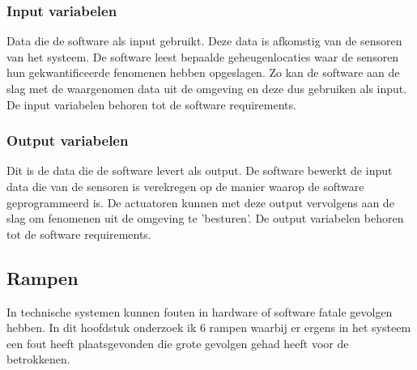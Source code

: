 \documentclass{article}
\begin{document}
\subsubsection{Input variabelen}
Data die de software als input gebruikt. Deze data is afkomstig van de sensoren van het systeem. De software leest bepaalde geheugenlocaties waar de sensoren hun gekwantificeerde fenomenen hebben opgeslagen. Zo kan de software aan de slag met de waargenomen data uit de omgeving en deze dus gebruiken als input. De input variabelen behoren tot de software requirements.


\subsubsection{Output variabelen}
Dit is de data die de software levert als output. De software bewerkt de input data die van de sensoren is verekregen op de manier waarop de software geprogrammeerd is. De actuatoren kunnen met deze output vervolgens aan de slag om fenomenen uit de omgeving te 'besturen'. De output variabelen behoren tot de software requirements.

\subsection{Rampen}
In technische systemen kunnen fouten in hardware of software fatale gevolgen hebben. In dit hoofdstuk onderzoek ik 6 rampen waarbij er ergens in het systeem een fout heeft plaatsgevonden die grote gevolgen gehad heeft voor de betrokkenen. 
\end{document}
